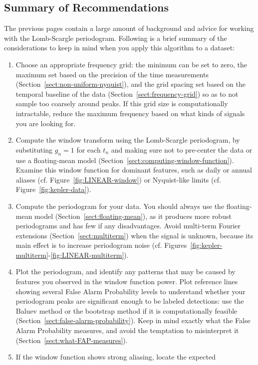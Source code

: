 \documentclass[preprint]{aastex}
\newcommand{\fig}[1]{Figure~\ref{fig:#1}}
\newcommand{\figs}[2]{Figures~\ref{fig:#1}-\ref{fig:#2}}
\newcommand{\Sect}[1]{Section~\ref{sect:#1}}
\newcommand{\sect}[1]{\Sect{#1}}
\newcommand{\sectlabel}[1]{\label{sect:#1}}
\begin{document}
\subsection{Summary of Recommendations}
\sectlabel{summary}
The previous pages contain a large amount of background and advice for working
with the Lomb-Scargle periodogram.
Following is a brief summary of the considerations to keep in mind when you
apply this algorithm to a dataset:
\begin{enumerate}
  \item Choose an appropriate frequency grid: the minimum can be set to zero,
    the maximum set based on the precision of the time measurements
    (\sect{non-uniform-nyquist}), and the grid spacing set based on the
    temporal baseline of the data (\sect{frequency-grid})
    so as to not sample too coarsely around peaks.
    If this grid size is computationally intractable, reduce the maximum
    frequency based on what kinds of signals you are looking for.
  \item Compute the window transform using the Lomb-Scargle periodogram,
    by substituting $g_n=1$ for each $t_n$ and making sure not to pre-center
    the data or use a floating-mean model (\sect{computing-window-function}).
    Examine this window function for dominant features, such as daily or
    annual aliases (cf. \fig{LINEAR-window})
    or Nyquist-like limits (cf. \fig{kepler-data}).
  \item Compute the periodogram for your data. You should always use the
    floating-mean model (\sect{floating-mean}), as it produces more robust
    periodograms and has few if any disadvantages. Avoid multi-term Fourier
    extensions (\sect{multiterm}) when the signal is unknown, because its
    main effect is to increase periodogram noise
    (cf. \figs{kepler-multiterm}{LINEAR-multiterm}).
  \item Plot the periodogram, and identify any patterns that may be caused
    by features you observed in the window function power. Plot reference
    lines showing several False Alarm Probability levels to understand whether
    your periodogram peaks are significant enough to be labeled detections:
    use the Baluev method or the bootstrap method if it is computationally
    feasible (\sect{false-alarm-probability}).
    Keep in mind exactly what the False Alarm Probability measures, and
    avoid the temptation to misinterpret it (\sect{what-FAP-measures}).
  \item If the window function shows strong aliasing, locate the expected

\end{enumerate}
\end{document}

